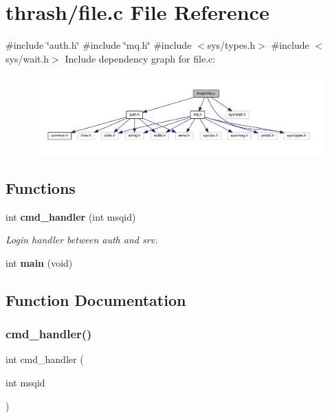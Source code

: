 \section{thrash/file.c File Reference}
\label{file_8c}
{\ttfamily \#include \char`\"{}auth.\+h\char`\"{}}\newline
{\ttfamily \#include \char`\"{}mq.\+h\char`\"{}}\newline
{\ttfamily \#include $<$sys/types.\+h$>$}\newline
{\ttfamily \#include $<$sys/wait.\+h$>$}\newline
Include dependency graph for file.\+c\+:\nopagebreak
\begin{figure}[H]
\begin{center}
\leavevmode
\includegraphics[width=350pt]{file_8c__incl}
\end{center}
\end{figure}
\subsection*{Functions}
\begin{DoxyCompactItemize}
\item 
int \textbf{ cmd\+\_\+handler} (int msqid)
\begin{DoxyCompactList}\small\item\em Login handler between auth and srv. \end{DoxyCompactList}\item 
int \textbf{ main} (void)
\end{DoxyCompactItemize}


\subsection{Function Documentation}
\mbox{\label{file_8c_a975d9337db509c0204b110f51d723160}} 
\subsubsection{cmd\+\_\+handler()}
{\footnotesize\ttfamily int cmd\+\_\+handler (\begin{DoxyParamCaption}\item[{int}]{msqid }\end{DoxyParamCaption})}



